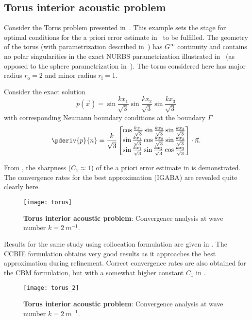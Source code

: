 \subsection{Torus interior acoustic problem}
Consider the Torus problem presented in~\cite{Simpson2014aib}. This example sets the stage for optimal conditions for the a priori error estimate in~ to be fulfilled. The geometry of the torus (with parametrization described in~) has $G^\infty$ continuity and contains no polar singularities in the exact NURBS parametrization illustrated in~ (as opposed to the sphere parametrization in~). The torus considered here has major radius $r_{\mathrm{o}} = 2$ and minor radius $r_{\mathrm{i}}=1$. 

Consider the exact solution
\begin{equation*}
	p(\vec{x}) = \sin\frac{kx_1}{\sqrt{3}}\sin\frac{kx_2}{\sqrt{3}}\sin\frac{kx_3}{\sqrt{3}}
\end{equation*}
with corresponding Neumann boundary conditions at the boundary $\Gamma$
\begin{equation*}
	\pderiv{p}{n} = \frac{k}{\sqrt{3}}\begin{bmatrix}
	\cos\frac{kx_1}{\sqrt{3}}\sin\frac{kx_2}{\sqrt{3}}\sin\frac{kx_3}{\sqrt{3}}\\
	\sin\frac{kx_1}{\sqrt{3}}\cos\frac{kx_2}{\sqrt{3}}\sin\frac{kx_3}{\sqrt{3}}\\
	\sin\frac{kx_1}{\sqrt{3}}\sin\frac{kx_2}{\sqrt{3}}\cos\frac{kx_3}{\sqrt{3}}
	\end{bmatrix}\cdot\vec{n}.
\end{equation*}

From , the sharpness ($C_1 \approx 1$) of the a priori error estimate in  is demonstrated. The convergence rates for the best approximation (IGABA) are revealed quite clearly here. 
\begin{figure}
	\centering
	\texttt{[image: torus]}
	\caption{\textbf{Torus interior acoustic problem}: Convergence analysis at wave number ${k=\SI{2}{m^{-1}}}$.}
	\label{Fig3:torus}
\end{figure}

Results for the same study using collocation formulation are given in . The CCBIE formulation obtains very good results as it approaches the best approximation during refinement. Correct convergence rates are also obtained for the CBM formulation, but with a somewhat higher constant $C_1$ in .
\begin{figure}
	\centering
	\texttt{[image: torus\_2]}
	\caption{\textbf{Torus interior acoustic problem}: Convergence analysis at wave number ${k=\SI{2}{m^{-1}}}$.}
	\label{Fig3:torus_2}
\end{figure}

